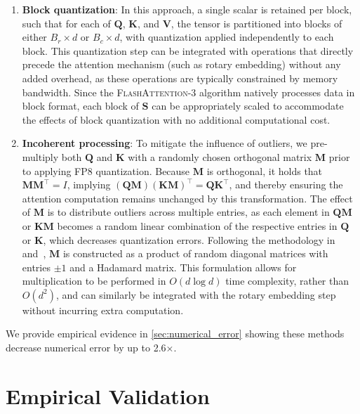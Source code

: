 \begin{enumerate}

\item \textbf{Block quantization}: In this approach, a single scalar is retained per block, such that for each of $\mathbf{Q}$, $\mathbf{K}$, and $\mathbf{V}$, the tensor is partitioned into blocks of either $B_r \times d$ or $B_c \times d$, with quantization applied independently to each block. This quantization step can be integrated with operations that directly precede the attention mechanism (such as rotary embedding) without any added overhead, as these operations are typically constrained by memory bandwidth. Since the \textsc{FlashAttention-3} algorithm natively processes data in block format, each block of $\mathbf{S}$ can be appropriately scaled to accommodate the effects of block quantization with no additional computational cost.
\item \textbf{Incoherent processing}: To mitigate the influence of outliers, we pre-multiply both $\mathbf{Q}$ and $\mathbf{K}$ with a randomly chosen orthogonal matrix $\mathbf{M}$ prior to applying FP8 quantization. Because $\mathbf{M}$ is orthogonal, it holds that $\mathbf{M} \mathbf{M}^\top = I$, implying $(\mathbf{Q} \mathbf{M}) (\mathbf{K} \mathbf{M})^\top = \mathbf{Q} \mathbf{K}^\top$, and thereby ensuring the attention computation remains unchanged by this transformation. The effect of $\mathbf{M}$ is to distribute outliers across multiple entries, as each element in $\mathbf{Q} \mathbf{M}$ or $\mathbf{K} \mathbf{M}$ becomes a random linear combination of the respective entries in $\mathbf{Q}$ or $\mathbf{K}$, which decreases quantization errors. Following the methodology in \citet{chee2024quip} and~\citet{tseng2024quip}, $\mathbf{M}$ is constructed as a product of random diagonal matrices with entries $\pm 1$ and a Hadamard matrix. This formulation allows for multiplication to be performed in $O(d \log d)$ time complexity, rather than $O(d^2)$, and can similarly be integrated with the rotary embedding step without incurring extra computation.
\end{enumerate}

We provide empirical evidence in \cref{sec:numerical_error} showing these methods decrease numerical error by up to 2.6$\times$.

\section{Empirical Validation}
\label{sec:exp}

